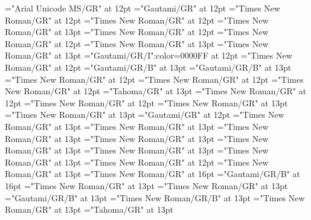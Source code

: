 \documentclass[a4paper]{article}
\begin{document}
\pagestyle{plain}
\sloppy
\setlength{\parfillskip}{0pt plus 1fil}
\font\xitemhi="Arial Unicode MS/GR" at 12pt
\font\xitemte="Gautami/GR" at 12pt
\font\xitemxitemCmPossibilitypublishStemTransTypeAbbreviationPubbefore="Times New Roman/GR" at 12pt
\font\xitemxitemcomplexformrefsbefore="Times New Roman/GR" at 12pt
\font\xitemxitemdefinitionbefore="Times New Roman/GR" at 13pt
\font\xitemxitemdefinitionLcbefore="Times New Roman/GR" at 12pt
\font\xitemxitemdefinitionLdbefore="Times New Roman/GR" at 12pt
\font\xitemxitementryrefcomponentbefore="Times New Roman/GR" at 13pt
\font\xitemxitementryreftypebefore="Times New Roman/GR" at 13pt
\font\xitemxitemexamplebefore="Gautami/GR/I":color=0000FF at 12pt
\font\xitemxitemexamplesbefore="Times New Roman/GR" at 12pt
\font\xitemxitemheadwordbefore="Gautami/GR/B" at 13pt
\font\xitemxitemLexEntrypublishStemComponentTargetHeadWordRefbefore="Gautami/GR/B" at 13pt
\font\xitemxitemLexSensepublishStemDefinitionPubbefore="Times New Roman/GR" at 12pt
\font\xitemxitemLexSensepublishStemDefinitionPubLdbefore="Times New Roman/GR" at 12pt
\font\xitemxitemprimaryrefsbefore="Times New Roman/GR" at 12pt
\font\xitemxitempronunciationbefore="Tahoma/GR" at 13pt
\font\xitemxitempronunciationsbefore="Times New Roman/GR" at 12pt
\font\xitemxitemsemanticdomainsbefore="Times New Roman/GR" at 12pt
\font\sensesensesensesbefore="Times New Roman/GR" at 13pt
\font\xitemxitemtranslationbefore="Times New Roman/GR" at 13pt
\font\xitemxitemtranslationLdbefore="Gautami/GR" at 12pt
\font\xitemxitemcrossrefbefore="Times New Roman/GR" at 13pt
\font\xitemxitemcrossreftargetsbefore="Times New Roman/GR" at 13pt
\font\xitemxitemcrossreftypebefore="Times New Roman/GR" at 13pt
\font\xitemxitemheadwordminorbefore="Times New Roman/GR" at 13pt
\font\xitemxitemmainentryrefbefore="Times New Roman/GR" at 13pt
\font\xitemxitemmainentryrefminorbefore="Times New Roman/GR" at 13pt
\font\xitemxitempronunciationminorbefore="Times New Roman/GR" at 13pt
\font\xitemxitemsensecrossrefbefore="Times New Roman/GR" at 12pt
\font\xitemxitemsensemainentryrefbefore="Times New Roman/GR" at 13pt
\font{}="Times New Roman/GR" at 16pt
\font{}="Gautami/GR/B" at 16pt
\font{}="Times New Roman/GR" at 13pt
\font\entryletDatadicBody="Times New Roman/GR" at 13pt
\font\headwordggoTeluINentryletDatadicBody="Gautami/GR/B" at 13pt
\font\spanenheadwordggoTeluINentryletDatadicBody="Times New Roman/GR/B" at 13pt
\font\pronunciationsentryletDatadicBody="Times New Roman/GR" at 13pt
\font\pronunciationggofonipaxemicpronunciationsentryletDatadicBody="Tahoma/GR" at 13pt
\end{document}
